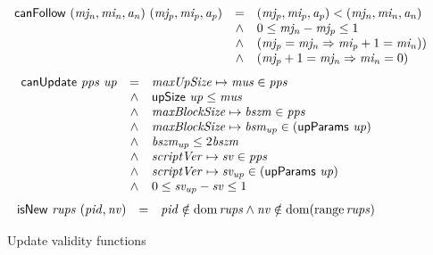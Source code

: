 \begin{figure}[htb]
  \begin{equation}
    \label{eq:func:can-follow}
    \begin{array}{r c l}
      \mathsf{canFollow}~(\mathit{mj_n}, \mathit{mi_n}, \mathit{a_n})~(\mathit{mj_p}, \mathit{mi_p}, \mathit{a_p})
      & = & (\mathit{mj_p}, \mathit{mi_p}, \mathit{a_p}) < (\mathit{mj_n}, \mathit{mi_n}, \mathit{a_n})\\
      & \wedge & 0 \leq \mathit{mj_n} - \mathit{mj_p} \leq 1\\
      & \wedge & (\mathit{mj_p} = \mathit{mj_n} \Rightarrow \mathit{mi_p} + 1 = \mathit{mi_n}))\\
      & \wedge & (\mathit{mj_p} + 1 = \mathit{mj_n} \Rightarrow \mathit{mi_n} = 0)
    \end{array}
  \end{equation}
  \nextdef
  \begin{equation}
    \label{eq:func:can-update}
    \begin{array}{r c l}
      \mathsf{canUpdate}~\mathit{pps}~\mathit{up}
      & = & \mathit{maxUpSize} \mapsto \mathit{mus} \in \mathit{pps}\\
      & \wedge & \mathsf{upSize}~\mathit{up} \leq \mathit{mus}\\
      & \wedge & \mathit{maxBlockSize} \mapsto \mathit{bszm} \in \mathit{pps}\\
      & \wedge & \mathit{maxBlockSize} \mapsto \mathit{bsm_{up}} \in (\mathsf{upParams}~\mathit{up})\\
      & \wedge & \mathit{bszm_{up}} \leq 2\mathit{bszm}\\
      & \wedge & \mathit{scriptVer} \mapsto \mathit{sv} \in \mathit{pps} \\
      & \wedge & \mathit{scriptVer} \mapsto \mathit{sv_{up}} \in (\mathsf{upParams}~\mathit{up}) \\
      & \wedge &  0 \leq \mathit{sv_{up}} - \mathit{sv} \leq 1
    \end{array}
  \end{equation}
  \nextdef
  \begin{equation}
    \label{eq:func:is-new}
    \begin{array}{r c l}
      \mathsf{isNew}~\mathit{rups}~(\mathit{pid}, \mathit{nv})
      & = &  \mathit{pid} \notin \operatorname{dom} \mathit{rups}
            \wedge \mathit{nv} \notin \operatorname{dom} (\operatorname{range} \mathit{rups})\\
    \end{array}
  \end{equation}
  \caption{Update validity functions}
\end{figure}

